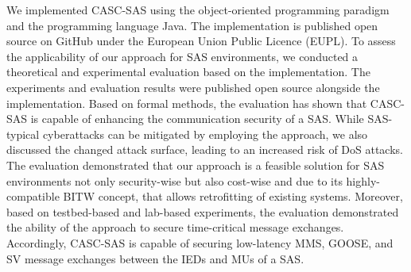 We implemented CASC-SAS using the object-oriented programming paradigm and the programming language Java.
The implementation is published open source on GitHub under the European Union Public Licence (EUPL).
To assess the applicability of our approach for SAS environments, we conducted a theoretical and experimental evaluation based on the implementation.
The experiments and evaluation results were published open source alongside the implementation.
Based on formal methods, the evaluation has shown that CASC-SAS is capable of enhancing the communication security of a SAS.
While SAS-typical cyberattacks can be mitigated by employing the approach, we also discussed the changed attack surface, leading to an increased risk of DoS attacks.
The evaluation demonstrated that our approach is a feasible solution for SAS environments not only security-wise but also cost-wise and due to its highly-compatible BITW concept, that allows retrofitting of existing systems.
Moreover, based on testbed-based and lab-based experiments, the evaluation demonstrated the ability of the approach to secure time-critical message exchanges.
Accordingly, CASC-SAS is capable of securing low-latency MMS, GOOSE, and SV message exchanges between the IEDs and MUs of a SAS.
